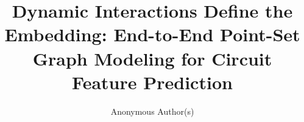 \documentclass[sigconf, anonymous]{acmart}
\begin{document}
\title{Dynamic Interactions Define the Embedding: End-to-End Point-Set Graph Modeling for Circuit Feature Prediction}

\author{Anonymous Author(s)}

\begin{abstract}

\end{abstract}

\maketitle

\renderFigureIntro{}



\renderFigureFramework{}







\balance


\end{document}

